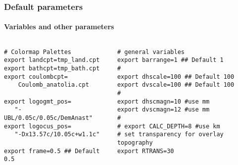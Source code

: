 \begin{frame}[t,fragile]
  \frametitle{Default parameters}
  \framesubtitle{Variables and other parameters}
  \label{ch3fr:defvarpar}
\begin{columns}[t]
  \begin{column}{.45\textwidth}
\begin{scriptsize}
	\begin{verbatim}
# Colormap Palettes
export landcpt=tmp_land.cpt
export bathcpt=tmp_bath.cpt
export coulombcpt=
	Coulomb_anatolia.cpt

export logogmt_pos=
   "-UBL/0.05c/0.05c/DemAnast"
export logocus_pos=
   "-Dx13.57c/10.05c+w1.1c"

export frame=0.5 ## Default 0.5
\end{verbatim}
	\end{scriptsize}
  \end{column}
  \begin{column}{.54\textwidth}
\begin{scriptsize}
	\begin{verbatim}
# general variables
export barrange=1 ## Default 1
#
export dhscale=100 ## Default 100
export dvscale=100 ## Default 100
#
export dhscmagn=10 #use mm
export dvscmagn=12 #use mm
#
# export CALC_DEPTH=8 #use km
# set transparency for overlay topography
export RTRANS=30
\end{verbatim}	  
	\end{scriptsize}
  \end{column}
\end{columns}
\end{frame}
\note{} %




















